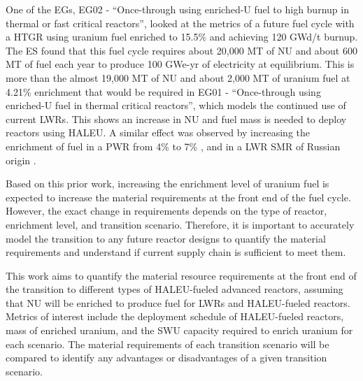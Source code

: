 One of the \glspl{EG}, \gls{EG}02 - ``Once-through using enriched-U fuel to 
high burnup in thermal or fast critical reactors'', looked at the metrics 
of a future fuel cycle with a \gls{HTGR} using uranium fuel enriched to 
15.5\% and achieving 120 GWd/t burnup. The \gls{ES} found that this fuel cycle
requires about 20,000 MT of \gls{NU} and about 600 MT of fuel each year 
to produce 100 GWe-yr of electricity at equilibrium. This is more than the 
almost 19,000 MT of \gls{NU} and about 2,000 MT of uranium fuel at 4.21\%
enrichment that would be required in \gls{EG}01 - ``Once-through using enriched-U 
fuel in thermal critical reactors'', which models the continued use of current 
\glspl{LWR}. This shows an increase in \gls{NU} and fuel mass is needed to 
deploy reactors using \gls{HALEU}.
A similar effect was observed by increasing the enrichment of fuel in a 
\gls{PWR} from 4\% to 7\% \cite{burns_reactor_2020}, and in a \gls{LWR}
\gls{SMR} of Russian origin \cite{hernandez_potential_2020}. 

Based on this prior work, increasing the enrichment level of uranium fuel 
is expected to  
increase the material requirements at the front end of 
the fuel cycle. However, the exact change in requirements depends 
on the type of reactor, enrichment level, and transition scenario.
Therefore, it is important to accurately model the transition to any future
reactor designs to quantify the material requirements and understand
if current supply chain is sufficient to meet them. 

This work aims to quantify the material resource requirements at the front 
end of the 
transition to different types of \gls{HALEU}-fueled advanced reactors, 
assuming that \gls{NU} will be enriched to produce fuel for \glspl{LWR} and 
\gls{HALEU}-fueled reactors. 
Metrics of interest include the deployment schedule of \gls{HALEU}-fueled 
reactors, mass of enriched uranium, and the \gls{SWU} capacity required to 
enrich uranium for each scenario. The material requirements of each transition 
scenario will be compared to identify any advantages or disadvantages of 
a given transition scenario. 